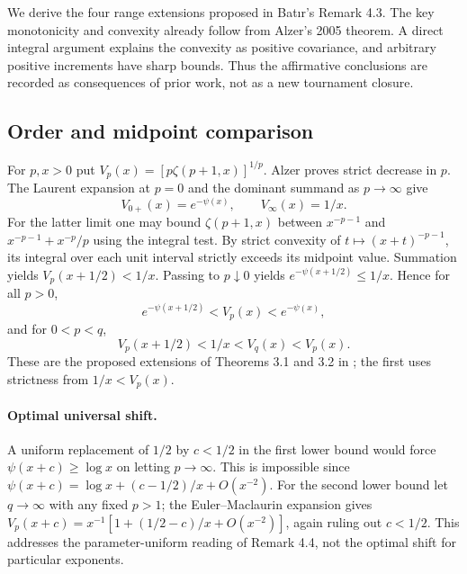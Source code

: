 \documentclass[11pt,a4paper]{article}
\numberwithin{equation}{section}
\theoremstyle{definition}
\theoremstyle{remark}
\newenvironment{sectionabstract}{\par\smallskip\begingroup\small\noindent}{\par\endgroup\medskip}
\begin{document}
\begin{sectionabstract}
We derive the four range extensions proposed in Bat\i r's Remark 4.3. The key monotonicity and convexity already follow from Alzer's 2005 theorem. A direct integral argument explains the convexity as positive covariance, and arbitrary positive increments have sharp bounds. Thus the affirmative conclusions are recorded as consequences of prior work, not as a new tournament closure.
\end{sectionabstract}
\subsection{Order and midpoint comparison}
For $p,x>0$ put $V_p(x)=[p\zeta(p+1,x)]^{1/p}$. Alzer \cite{r31meiji:A} proves strict decrease in $p$. The Laurent expansion at $p=0$ and the dominant summand as $p\to\infty$ give
\[
 V_{0+}(x)=e^{-\psi(x)},\qquad V_\infty(x)=1/x .
\]
For the latter limit one may bound $\zeta(p+1,x)$ between $x^{-p-1}$ and $x^{-p-1}+x^{-p}/p$ using the integral test. By strict convexity of $t\mapsto(x+t)^{-p-1}$, its integral over each unit interval strictly exceeds its midpoint value. Summation yields $V_p(x+1/2)<1/x$. Passing to $p\downarrow0$ yields $e^{-\psi(x+1/2)}\le 1/x$. Hence for all $p>0$,
\[
 e^{-\psi(x+1/2)}<V_p(x)<e^{-\psi(x)},
\]
and for $0<p<q$,
\[
 V_p(x+1/2)<1/x<V_q(x)<V_p(x).
\]
These are the proposed extensions of Theorems 3.1 and 3.2 in \cite{r31meiji:B}; the first uses strictness from $1/x<V_p(x)$.
\paragraph{Optimal universal shift.}
A uniform replacement of $1/2$ by $c<1/2$ in the first lower bound would force $\psi(x+c)\ge\log x$ on letting $p\to\infty$. This is impossible since $\psi(x+c)=\log x+(c-1/2)/x+O(x^{-2})$. For the second lower bound let $q\to\infty$ with any fixed $p>1$; the Euler--Maclaurin expansion gives $V_p(x+c)=x^{-1}[1+(1/2-c)/x+O(x^{-2})]$, again ruling out $c<1/2$. This addresses the parameter-uniform reading of Remark 4.4, not the optimal shift for particular exponents.
\end{document}
